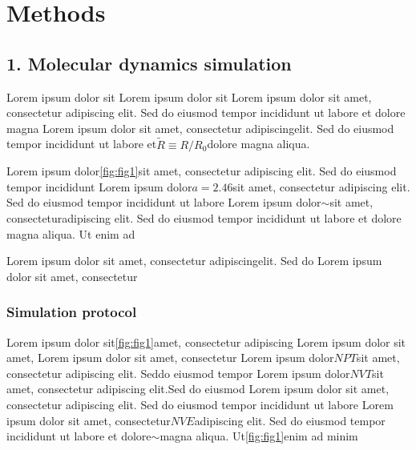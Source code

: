 \documentclass{article}
\begin{document}
\section*{Methods}

\subsection*{1. Molecular dynamics simulation}

Lorem ipsum dolor sit\cite{example2024}
Lorem ipsum dolor sit
Lorem ipsum dolor sit amet, consectetur adipiscing elit. Sed do eiusmod tempor incididunt ut labore et dolore magna
Lorem ipsum dolor sit amet, consectetur adipiscing\cite{example2024}elit. Sed do eiusmod tempor incididunt ut labore et$\widetilde{R} \equiv R/R_0$dolore magna aliqua.

Lorem ipsum dolor\ref{fig:fig1}sit amet, consectetur adipiscing elit. Sed do eiusmod tempor incididunt
Lorem ipsum dolor$a = 2.46$sit amet, consectetur adipiscing elit. Sed do eiusmod tempor incididunt ut labore
Lorem ipsum dolor$\sim$sit amet, consecteturadipiscing elit. Sed do eiusmod tempor incididunt ut labore et dolore magna aliqua. Ut enim ad

Lorem ipsum dolor sit amet, consectetur adipiscing\cite{example2024}elit. Sed do
Lorem ipsum dolor sit amet, consectetur

\subsubsection*{Simulation protocol}
Lorem ipsum dolor sit\ref{fig:fig1}amet, consectetur adipiscing
Lorem ipsum dolor sit amet,
Lorem ipsum dolor sit amet, consectetur\cite{example2024}
Lorem ipsum dolor$NPT$sit amet, consectetur adipiscing elit. Seddo eiusmod tempor
Lorem ipsum dolor$NVT$sit amet, consectetur adipiscing elit.\cite{example2024}Sed do eiusmod
Lorem ipsum dolor sit amet, consectetur adipiscing elit. Sed do eiusmod tempor incididunt ut labore
Lorem ipsum dolor sit amet, consectetur$NVE$adipiscing elit. Sed do eiusmod tempor incididunt ut labore et dolore$\sim$magna aliqua. Ut\ref{fig:fig1}enim ad minim
\end{document}
